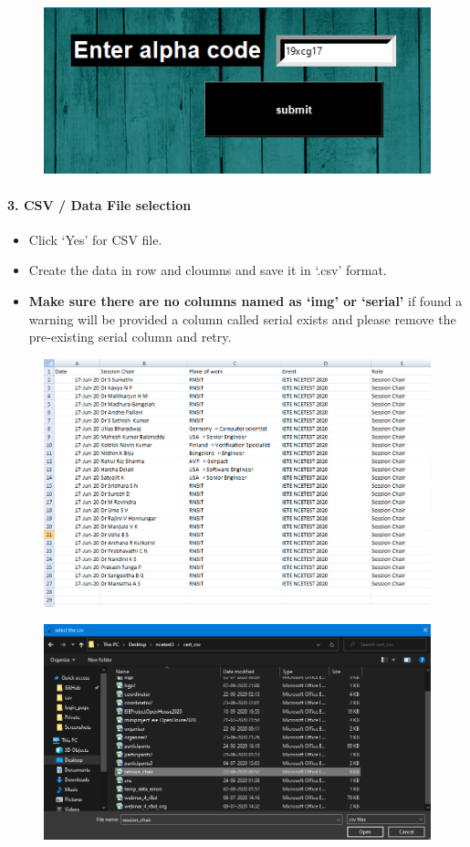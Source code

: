 \begin{figure}[H]
	\centering
	\includegraphics[width=0.5\linewidth]{"images/generation_qr_nqr/Screenshot (34)"}
	\label{fig:screenshot-34}
\end{figure}

\newpage
\paragraph{3. CSV / Data File selection}

\begin{itemize}
	\item Click `Yes' for CSV file.
	\item Create the data in row and cloumns and save it in `.csv' format.
	\item \textbf{Make sure there are no columns named as `img' or `serial'} if found a warning will be provided a column called serial exists and please remove the pre-existing serial column and retry.
\end{itemize}

\begin{figure}[H]
	\centering
	\includegraphics[width=0.85\linewidth]{"images/generation_qr_nqr/Screenshot (37)"}
	\caption{}
	\label{fig:screenshot-37}
\end{figure}

\begin{figure}[H]
	\centering
	\includegraphics[width=0.9\linewidth]{"images/generation_qr_nqr/Screenshot (38)"}
	\caption{}
	\label{fig:screenshot-38}
\end{figure}

